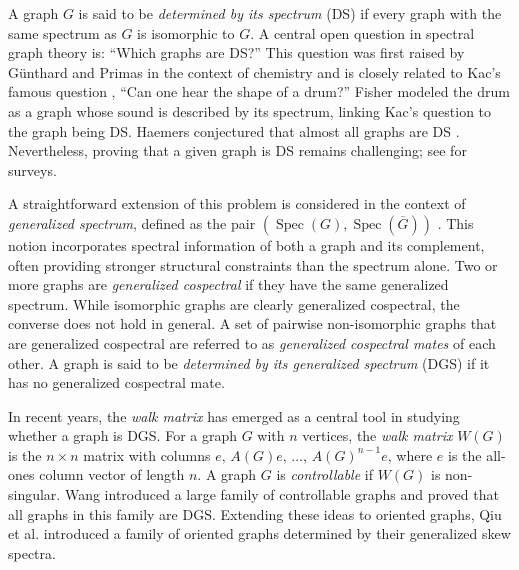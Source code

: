 \documentclass[12pt]{article}
\theoremstyle{plain}
\theoremstyle{definition}
\begin{document}
A graph $G$ is said to be \emph{determined by its spectrum} (DS) if every graph with the same spectrum as $G$ is isomorphic to $G$. A central open question in spectral graph theory is: “Which graphs are DS?” This question was first raised by Günthard and Primas \cite{gunthard1956zusammenhang} in the context of chemistry and is closely related to Kac’s famous question \cite{kac1966can}, “Can one hear the shape of a drum?” Fisher \cite{fisher1966hearing} modeled the drum as a graph whose sound is described by its spectrum, linking Kac’s question to the graph being DS. Haemers conjectured that almost all graphs are DS \cite{van2003graphs, haemers2016almost}. Nevertheless, proving that a given graph is DS remains challenging; see \cite{van2003graphs, van2009developments} for surveys.

A straightforward extension of this problem is considered in the context of \emph{generalized spectrum}, defined as the pair $(\operatorname{Spec}(G), \operatorname{Spec}(\overline{G}))$ \cite{wang2006sufficient}. This notion incorporates spectral information of both a graph and its complement, often providing stronger structural constraints than the spectrum alone. Two or more graphs are \emph{generalized cospectral} if they have the same generalized spectrum. While isomorphic graphs are clearly generalized cospectral, the converse does not hold in general. A set of pairwise non-isomorphic graphs that are generalized cospectral are referred to as \emph{generalized cospectral mates} of each other. A graph is said to be \emph{determined by its generalized spectrum} (DGS) if it has no generalized cospectral mate.


In recent years, the {\em walk matrix} has emerged as a central tool in studying whether a graph is DGS. For a graph $G$ with $n$ vertices, the \emph{walk matrix} $W(G)$ is the $n \times n$ matrix with columns $e,\, A(G)e,\, \dots,\, A(G)^{n-1}e$, where $e$ is the all-ones column vector of length $n$. A graph $G$ is \emph{controllable} if $W(G)$ is non-singular. Wang \cite{wang2017simple} introduced a large family of controllable graphs and proved that all graphs in this family are DGS. Extending these ideas to oriented graphs, Qiu et al. \cite{qiu2021oriented} introduced a family of oriented graphs determined by their generalized skew spectra.
\end{document}
